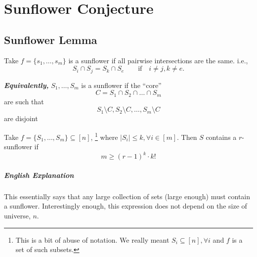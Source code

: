 \chapter{Sunflower Conjecture}

\section{Sunflower Lemma}

\begin{definition}
	Take $f = \{ s_1 , \dots, s_m \}$ is a sunflower if all pairwise intersections are the same. i.e., 
	\begin{equation}
		S_i \cap S_j = S_k \cap S_e \quad \quad \text{if} \quad i \neq j, k \neq e.
	\end{equation}
	
	\textbf{\textit{Equivalently, }}
	$S_1, \dots, S_m$ is a sunflower if the ``core''
	\begin{equation}
		C = S_1 \cap S_2 \cap \dots \cap S_m
	\end{equation}
	are such that 
	\begin{equation}
		S_1 \text{\textbackslash} C, S_2 \text{\textbackslash} C, \dots, S_m \text{\textbackslash} C
	\end{equation}
	are disjoint
\end{definition}

\begin{lemma}
	Take $f = \{ S_1, \dots, S_m \} \subseteq [n]$, \footnote{
	This is a bit of abuse of notation. We really meant $S_i \subseteq [n], \forall i$ and $f$ is a set of such subsets. 
	}
	where $|S_i| \leq k, \forall i \in [m]$. Then $S$ contains a $r$-sunflower if 
	\begin{equation}
		m \geq (r - 1)^k \cdot k!
	\end{equation}
	
	\paragraph{English Explanation} This essentially says that any large collection of sets (large enough) must contain a sunflower. Interestingly enough, this expression does not depend on the size of universe, $n$. 
\end{lemma}

